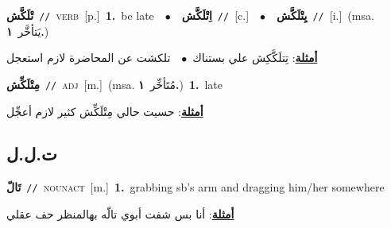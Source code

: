 \documentclass[10pt,a4paper,twoside]{article} %
\begin{document}
\begin{multicols}{2}
{\setlength\topsep{0pt}\textbf{\foreignlanguage{arabic}{تْلَكَّش}}\ {\color{gray}\texttt{//}\color{black}}\ \textsc{verb}\ [p.]\ \textbf{1.}~be late\ \ $\bullet$\ \ \setlength\topsep{0pt}\textbf{\foreignlanguage{arabic}{اِتْلَكَّش}}\ {\color{gray}\texttt{//}\color{black}}\ [c.]\ \ $\bullet$\ \ \setlength\topsep{0pt}\textbf{\foreignlanguage{arabic}{يِتْلَكَّش}}\ {\color{gray}\texttt{//}\color{black}}\ [i.]\ \color{gray}(msa. \foreignlanguage{arabic}{يَتأخَّر}~\foreignlanguage{arabic}{\textbf{١.}})\color{black}\  \begin{flushright}\color{gray}\foreignlanguage{arabic}{\textbf{\underline{\foreignlanguage{arabic}{أمثلة}}}: تِتلَكَّكِش علي بستناك\ $\bullet$\ \  تلكشت عن المحاضرة لازم استعجل}\end{flushright}\color{black}} \vspace{2mm}

{\setlength\topsep{0pt}\textbf{\foreignlanguage{arabic}{مِتْلَكِّش}}\ {\color{gray}\texttt{//}\color{black}}\ \textsc{adj}\ [m.]\ \color{gray}(msa. \foreignlanguage{arabic}{مُتَأخِّر}~\foreignlanguage{arabic}{\textbf{١.}})\color{black}\ \textbf{1.}~late\  \begin{flushright}\color{gray}\foreignlanguage{arabic}{\textbf{\underline{\foreignlanguage{arabic}{أمثلة}}}: حسيت حالي مِتْلَكِّش كثير لازم أعجِّل}\end{flushright}\color{black}} \vspace{2mm}

\vspace{-3mm}
\subsection*{\color{blue}\foreignlanguage{arabic}{ت.ل.ل}\color{blue}{}} 

{\setlength\topsep{0pt}\textbf{\foreignlanguage{arabic}{تَالّ}}\ {\color{gray}\texttt{//}\color{black}}\ \textsc{noun\textunderscore act}\ [m.]\ \textbf{1.}~grabbing sb's arm and dragging him/her somewhere\  \begin{flushright}\color{gray}\foreignlanguage{arabic}{\textbf{\underline{\foreignlanguage{arabic}{أمثلة}}}: أنا بس شفت أبوي تالّه بهالمنظر حف عقلي}\end{flushright}\color{black}} \vspace{2mm}


\end{multicols}
\end{document}
